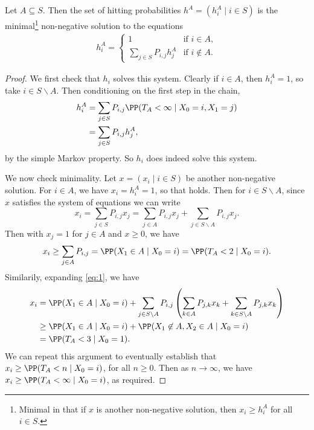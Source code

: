 \documentclass[a4paper]{scrartcl}
\begin{document}
\begin{theorem}
	Let $A \subseteq S$. Then the set of hitting probabilities $h^A = (h_i^A \mid i \in S)$ is the minimal\footnote{Minimal in that if $x$ is another non-negative solution, then $x_i \geq h_i^A$ for all $i \in S$.} non-negative solution to the equations
	\begin{align*}
		h_i^A = \begin{cases}
			1 &\mbox{if } i  \in A, \\
			\sum_{j \in S} P_{i, j} h_j^A &\mbox{if } i \not \in A.
		   \end{cases}
	\end{align*}
\end{theorem}
\begin{proof}
	We first check that $h_i$ solves this system. Clearly if $i \in A$, then $h_i^A = 1$, so take $i \in S\backslash A$. Then conditioning on the first step in the chain,
	\begin{align*}
		h_i^A &= \sum_{j \in S} P_{i, j} \PP(T_A < \infty \mid X_0 = i, X_1 = j)  \\
		&= \sum_{j \in S} P_{i, j} h_j^A,
	\end{align*}
	by the simple Markov property. So $h_i$ does indeed solve this system.

	We now check minimality. Let $x = (x_i \mid i \in S)$ be another non-negative solution. For $i \in A$, we have $x_i = h^A_i = 1$, so that holds. Then for $i \in S \backslash A$, since $x$ satisfies the system of equations we can write
	\begin{equation}\label{eq:1}
		x_i = \sum_{j \in S}P_{i, j} x_j = \sum_{j \in A} P_{i, j} x_j + \sum_{j \in S \backslash A} P_{i, j} x_j. \tag{$\dagger$}
	\end{equation}
	Then with $x_j = 1$ for $j \in A$ and $x \geq 0$, we have
	\begin{align*}
		x_i \geq \sum_{j \in A} P_{i, j} = \PP(X_1 \in A \mid X_0 = i) = \PP(T_A < 2 \mid X_0 = i).
	\end{align*}
	Similarily, expanding \eqref{eq:1}, we have
	\begin{align*}
	x_i &= \PP(X_1 \in A \mid X_0 = i) + \sum_{j \in S \backslash A} P_{i, j} \left(\sum_{k \in A} P_{j, k} x_k + \sum_{k \in S \backslash A} P_{j, k} x_k\right) \\
		&\geq \PP(X_1 \in A \mid X_0 = i) + \PP(X_1 \not \in A, X_2 \in A \mid X_0 = i) \\
		&= \PP(T_A < 3 \mid X_0 = 1).
	\end{align*}
	We can repeat this argument to eventually establish that $x_i \geq \PP(T_A < n \mid X_0 = i)$, for all $n \geq 0$. Then as $n \rightarrow \infty$, we have $x_i \geq \PP(T_A < \infty \mid X_0 = i)$, as required.
\end{proof}
\end{document}
